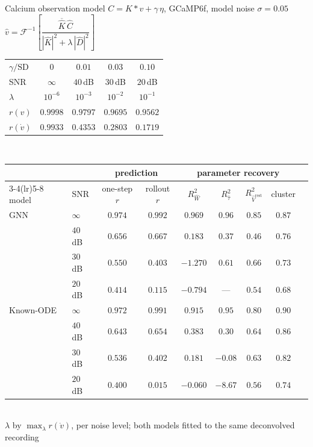 \documentclass[aspectratio=169]{beamer}
\newcommand{\good}[1]{\textcolor{goodgreen}{#1}}
\newcommand{\bad}[1]{\textcolor{badred}{#1}}
\begin{document}
\begin{frame}{Calcium observation model}
\vspace*{0.3cm}
{\centering\scriptsize
$C = K * v + \gamma\,\eta$, \quad GCaMP6f, \quad model noise $\sigma = 0.05$
\qquad
$\hat v = \mathcal{F}^{-1}\!\left[\dfrac{\overline{\hat K}\,\hat C}
 {|\hat K|^2 + \lambda\,|\hat D|^2}\right]$\\[4pt]}
\centering\tiny
\setlength{\tabcolsep}{6pt}
\begin{tabular}{lcccc}
\toprule
$\gamma/\mathrm{SD}$ & $0$ & $0.01$ & $0.03$ & $0.10$ \\
SNR & $\infty$ & $40$\,dB & $30$\,dB & $20$\,dB \\
$\lambda$ & $10^{-6}$ & $10^{-3}$ & $10^{-2}$ & $10^{-1}$ \\
\midrule
$r(v)$      & \good{$0.9998$} & \good{$0.9797$} & \good{$0.9695$} & \good{$0.9562$} \\
$r(\dot v)$ & \good{$0.9933$} & $0.4353$ & \bad{$0.2803$} & \bad{$0.1719$} \\
\bottomrule
\end{tabular}\\[7pt]
\setlength{\tabcolsep}{5pt}
\begin{tabular}{llccccccc}
\toprule
 & & \multicolumn{2}{c}{prediction} & \multicolumn{4}{c}{parameter recovery} \\
\cmidrule(lr){3-4}\cmidrule(lr){5-8}
model & SNR & one-step $r$ & rollout $r$
  & $R^2_{\hat W}$ & $R^2_{\hat\tau}$ & $R^2_{\hat V^{\mathrm{rest}}}$ & cluster \\
\midrule
GNN & $\infty$   & \good{$0.974$} & \good{$0.992$} & \good{$0.969$} & \good{$0.96$} & $0.85$ & $0.87$ \\
    & $40$\,dB   & $0.656$ & $0.667$ & \bad{$0.183$} & $0.37$ & $0.46$ & $0.76$ \\
    & $30$\,dB   & $0.550$ & $0.403$ & \bad{$-1.270$} & $0.61$ & $0.66$ & $0.73$ \\
    & $20$\,dB   & $0.414$ & \bad{$0.115$} & \bad{$-0.794$} & \multicolumn{1}{c}{---} & $0.54$ & $0.68$ \\
\midrule
Known-ODE & $\infty$ & \good{$0.972$} & \good{$0.991$} & \good{$0.915$} & \good{$0.95$} & $0.80$ & \good{$0.90$} \\
    & $40$\,dB   & $0.643$ & $0.654$ & $0.383$ & \bad{$0.30$} & $0.64$ & $0.86$ \\
    & $30$\,dB   & $0.536$ & $0.402$ & \bad{$0.181$} & \bad{$-0.08$} & $0.63$ & $0.82$ \\
    & $20$\,dB   & $0.400$ & \bad{$0.015$} & \bad{$-0.060$} & \bad{$-8.67$} & $0.56$ & $0.74$ \\
\bottomrule
\end{tabular}\\[4pt]
{\tiny $\lambda$ by $\max_\lambda r(\dot v)$, per noise level; both models fitted to the
same deconvolved recording}
\end{frame}
\end{document}
